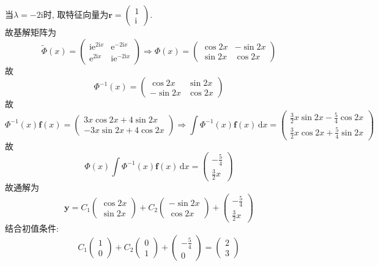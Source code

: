 \documentclass[titlepage,11pt,a4paper,twoside]{report}
\makeatletter
\newcommand\diff{\,\mathrm{d}}
\newcommand\e{\mathrm{e}}
\newcommand\ii{\mathrm{i}}
\newcommand\bmitPhi{\bm{\varPhi}}
\newenvironment{solve}{\par
	\pushQED{\qed}%
	\normalfont \topsep1\p@\@plus6\p@\relax
	\trivlist
	\item\relax
	{\hspace*{\parindent}{\heiti 解}\@addpunct{:}}\hspace\labelsep\ignorespaces
}{%
	\popQED\endtrivlist\@endpefalse
}
\makeatother
\begin{document}
\begin{solve}
当$\lambda=-2\ii$时, 取特征向量为$\bm{r}=\begin{pmatrix}1\\\ii\end{pmatrix}$.\\
故基解矩阵为
\[\widetilde{\bmitPhi}(x)=\begin{pmatrix}\ii\e^{2\ii x}&\e^{-2\ii x}\\\e^{2\ii x}&\ii\e^{-2\ii x}\end{pmatrix}\Rightarrow\bmitPhi(x)=\begin{pmatrix}\cos2x&-\sin2x\\\sin2x&\cos2x\end{pmatrix}\]
故
\[\bmitPhi^{-1}(x)=\begin{pmatrix}\cos2x&\sin2x\\-\sin2x&\cos2x\end{pmatrix}\]
故
\[\bmitPhi^{-1}(x)\bm{f}(x)=\begin{pmatrix}3x\cos2x+4\sin2x\\-3x\sin2x+4\cos2x\end{pmatrix}\Rightarrow\int\bmitPhi^{-1}(x)\bm{f}(x)\diff x=\begin{pmatrix}\frac{3}{2}x\sin2x-\frac{5}{4}\cos2x\\\frac{3}{2}x\cos2x+\frac{5}{4}\sin2x\end{pmatrix}\]
故
\[\bmitPhi(x)\int\bmitPhi^{-1}(x)\bm{f}(x)\diff x=\begin{pmatrix}-\frac{5}{4}\\\frac{3}{2}x\end{pmatrix}\]
故通解为
\[\bm{y}=C_1\begin{pmatrix}\cos2x\\\sin2x\end{pmatrix}+C_2\begin{pmatrix}-\sin2x\\\cos2x\end{pmatrix}+\begin{pmatrix}-\frac{5}{4}\\\frac{3}{2}x\end{pmatrix}\]
结合初值条件:
\[C_1\begin{pmatrix}1\\0\end{pmatrix}+C_2\begin{pmatrix}0\\1\end{pmatrix}+\begin{pmatrix}-\frac{5}{4}\\0\end{pmatrix}=\begin{pmatrix}2\\3\end{pmatrix}\]

\end{solve}
\end{document}
